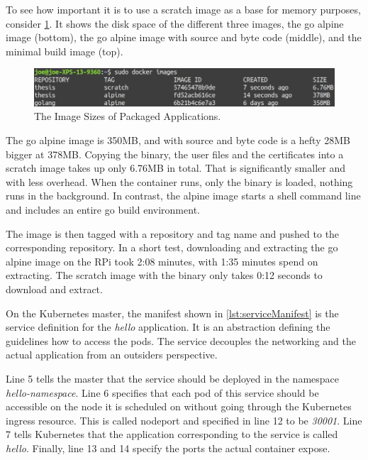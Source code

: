 To see how important it is to use a scratch image as a base for memory purposes, consider \cref{fig:imageSizeComparison}. It shows the disk space of the different three images, the go alpine image (bottom), the go alpine image with source and byte code (middle), and the minimal build image (top).
\begin{figure}[h!]
    \centering
    \includegraphics[scale=0.4]{figures/imageSizeComparison.png}
    \caption{The Image Sizes of Packaged Applications.}
    \label{fig:imageSizeComparison}
\end{figure}
The go alpine image is 350MB, and with source and byte code is a hefty 28MB bigger at 378MB. Copying the binary, the user files and the certificates into a scratch image takes up only 6.76MB in total. That is significantly smaller and with less overhead. When the container runs, only the binary is loaded, nothing runs in the background. In contrast, the alpine image starts a shell command line and includes an entire go build environment. 

The image is then tagged with a repository and tag name and pushed to the corresponding repository. In a short test, downloading and extracting the go alpine image on the RPi took 2:08 minutes, with 1:35 minutes spend on extracting. The scratch image with the binary only takes 0:12 seconds to download and extract.  

On the Kubernetes master, the manifest shown in \cref{lst:serviceManifest} is the service definition for the \textit{hello} application. It is an abstraction defining the guidelines how to access the pods. The service decouples the networking and the actual application from an outsiders perspective.

Line 5 tells the master that the service should be deployed in the namespace \textit{hello-namespace}. Line 6 specifies that each pod of this service should be accessible on the node it is scheduled on without going through the Kubernetes ingress resource. This is called nodeport and specified in line 12 to be \textit{30001}. Line 7 tells Kubernetes that the application corresponding to the service is called \textit{hello}. Finally, line 13 and 14 specify the ports the actual container expose.

